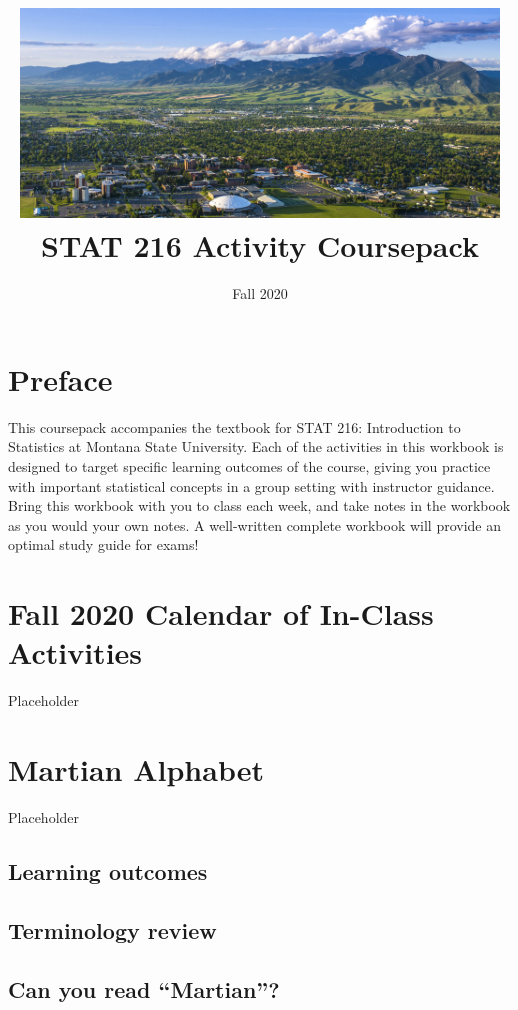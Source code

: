 \documentclass[
]{report}
\title{\includegraphics[width=5in,height=\textheight]{images/msu-campus.jpg}
\vspace{1cm}\\
STAT 216 Activity Coursepack}
\subtitle{Fall 2020}
\author{}
\date{\vspace{-2.5em}}
\begin{document}
\maketitle

{
\setcounter{tocdepth}{0}
\tableofcontents
}
\hypertarget{preface}{%
\chapter*{Preface}\label{preface}}

This coursepack accompanies the textbook for STAT 216: Introduction to Statistics at Montana State University. Each of the activities in this workbook is designed to target specific learning outcomes of the course, giving you practice with important statistical concepts in a group setting with instructor guidance. Bring this workbook with you to class each week, and take notes in the workbook as you would your own notes. A well-written complete workbook will provide an optimal study guide for exams!

\hypertarget{fall-2020-calendar-of-in-class-activities}{%
\chapter*{Fall 2020 Calendar of In-Class Activities}\label{fall-2020-calendar-of-in-class-activities}}

Placeholder

\hypertarget{martian-alphabet}{%
\chapter{Martian Alphabet}\label{martian-alphabet}}

Placeholder

\hypertarget{learning-outcomes}{%
\section{Learning outcomes}\label{learning-outcomes}}

\hypertarget{terminology-review}{%
\section{Terminology review}\label{terminology-review}}

\hypertarget{can-you-read-martian}{%
\section{Can you read ``Martian''?}\label{can-you-read-martian}}
\end{document}
